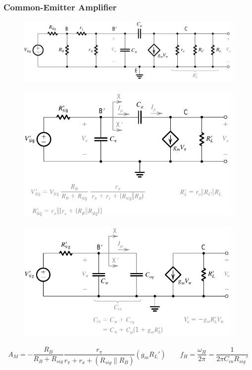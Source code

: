 \subsubsection{Common-Emitter Amplifier}

\begin{figure}[H]
  \centering
  \includegraphics[width=0.9\linewidth]{figures/Frequency-Response-CE-High-1}
\end{figure}

\begin{figure}[H]
  \centering
  \includegraphics[width=0.8\linewidth]{figures/Frequency-Response-CE-High-2}
\end{figure}

\begin{figure}[H]
  \centering
  \includegraphics[width=0.8\linewidth]{figures/Frequency-Response-CE-High-3}
\end{figure}

\begin{equation*}
  \begin{aligned}
    A_M = - \dfrac{R_B}{R_B + R_{sig}} \dfrac{r_{\pi}}{r_{\pi} + r_x + \left( R_{sig} \parallel R_B \right)} \left( g_m R_L' \right) \quad\quad f_H = \dfrac{\omega_H}{2 \pi} = \dfrac{1}{2 \pi C_{in} R_{sig}'}   
  \end{aligned}
\end{equation*}

